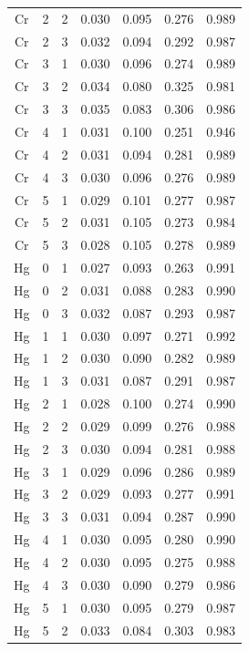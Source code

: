 \documentclass[ms, hidelinks]{uncgdissertationexp}
\theoremstyle{plain}
\theoremstyle{definition}
\theoremstyle{remark}
\begin{document}
\begin{longtable}{ccccccc}
Cr & 2 & 2 & 0.030 & 0.095 & 0.276 & 0.989\\
\rowcolor{gray!6}  Cr & 2 & 3 & 0.032 & 0.094 & 0.292 & 0.987\\
Cr & 3 & 1 & 0.030 & 0.096 & 0.274 & 0.989\\
\rowcolor{gray!6}  Cr & 3 & 2 & 0.034 & 0.080 & 0.325 & 0.981\\
Cr & 3 & 3 & 0.035 & 0.083 & 0.306 & 0.986\\
\rowcolor{gray!6}  Cr & 4 & 1 & 0.031 & 0.100 & 0.251 & 0.946\\
Cr & 4 & 2 & 0.031 & 0.094 & 0.281 & 0.989\\
\rowcolor{gray!6}  Cr & 4 & 3 & 0.030 & 0.096 & 0.276 & 0.989\\
Cr & 5 & 1 & 0.029 & 0.101 & 0.277 & 0.987\\
\rowcolor{gray!6}  Cr & 5 & 2 & 0.031 & 0.105 & 0.273 & 0.984\\
Cr & 5 & 3 & 0.028 & 0.105 & 0.278 & 0.989\\
\rowcolor{gray!6}  Hg & 0 & 1 & 0.027 & 0.093 & 0.263 & 0.991\\
Hg & 0 & 2 & 0.031 & 0.088 & 0.283 & 0.990\\
\rowcolor{gray!6}  Hg & 0 & 3 & 0.032 & 0.087 & 0.293 & 0.987\\
Hg & 1 & 1 & 0.030 & 0.097 & 0.271 & 0.992\\
\rowcolor{gray!6}  Hg & 1 & 2 & 0.030 & 0.090 & 0.282 & 0.989\\
Hg & 1 & 3 & 0.031 & 0.087 & 0.291 & 0.987\\
\rowcolor{gray!6}  Hg & 2 & 1 & 0.028 & 0.100 & 0.274 & 0.990\\
Hg & 2 & 2 & 0.029 & 0.099 & 0.276 & 0.988\\
\rowcolor{gray!6}  Hg & 2 & 3 & 0.030 & 0.094 & 0.281 & 0.988\\
Hg & 3 & 1 & 0.029 & 0.096 & 0.286 & 0.989\\
\rowcolor{gray!6}  Hg & 3 & 2 & 0.029 & 0.093 & 0.277 & 0.991\\
Hg & 3 & 3 & 0.031 & 0.094 & 0.287 & 0.990\\
\rowcolor{gray!6}  Hg & 4 & 1 & 0.030 & 0.095 & 0.280 & 0.990\\
Hg & 4 & 2 & 0.030 & 0.095 & 0.275 & 0.988\\
\rowcolor{gray!6}  Hg & 4 & 3 & 0.030 & 0.090 & 0.279 & 0.986\\
Hg & 5 & 1 & 0.030 & 0.095 & 0.279 & 0.987\\
\rowcolor{gray!6}  Hg & 5 & 2 & 0.033 & 0.084 & 0.303 & 0.983\\

\end{longtable}
\end{document}
